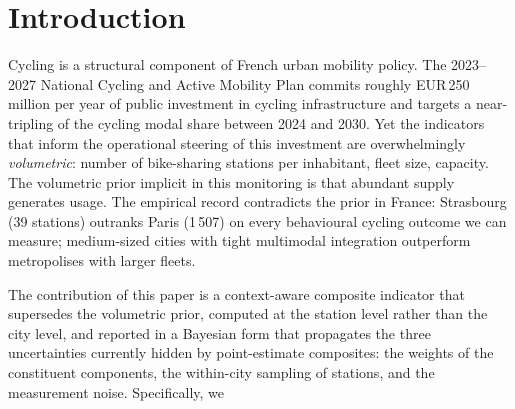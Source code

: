 \documentclass[11pt,a4paper]{article}
\begin{document}
\begin{abstract}
\textbf{Empirical findings.} (i) Strasbourg, Montpellier and
Paris lead the French ranking with overlapping credible
intervals; (ii) the Spearman correlation between IMD and
median household income is $\rho = +0.04$ ($p = 0.76$),
falsifying the affluence prior; (iii) $80.8\,\%$ of
station-level IMD variance is \emph{within} cities rather than
between, so any city-level point estimate discards four-fifths of
the empirical signal; (iv) under the French-calibrated weight
posterior applied to ten European systems with OSM-based
multimodality, the global Top-3 is European (Budapest, Warsaw,
Vienna), placing the best French city (Strasbourg) in fourth
position; (v) a feed-level GTFS data-quality anomaly (A6) on the
Gold Standard pipeline is absorbed by wider posterior credible
intervals on six affected cities.

All code, data products, MCMC chains and experiment scripts are
released openly under the FAIR principles.

\smallskip
\noindent\textbf{Keywords:} bike-sharing systems; composite
indicators; Bayesian inference; Metropolis-Hastings; multimodal
accessibility; General Bikeshare Feed Specification;
station-level; France.
\end{abstract}

\section{Introduction}
\label{sec:introduction}

Cycling is a structural component of French urban mobility
policy. The 2023--2027 National Cycling and Active Mobility Plan
commits roughly EUR\,250 million per year of public investment
in cycling infrastructure and targets a near-tripling of the
cycling modal share between 2024 and 2030. Yet the indicators
that inform the operational steering of this investment are
overwhelmingly \emph{volumetric}: number of bike-sharing stations
per inhabitant, fleet size, capacity. The volumetric prior
implicit in this monitoring is that abundant supply generates
usage. The empirical record contradicts the prior in France:
Strasbourg (39 stations) outranks Paris (1\,507) on every
behavioural cycling outcome we can measure; medium-sized cities
with tight multimodal integration outperform metropolises with
larger fleets.

The contribution of this paper is a context-aware composite
indicator that supersedes the volumetric prior, computed at the
station level rather than the city level, and reported in a
Bayesian form that propagates the three uncertainties currently
hidden by point-estimate composites: the weights of the
constituent components, the within-city sampling of stations,
and the measurement noise. Specifically, we
\end{document}
